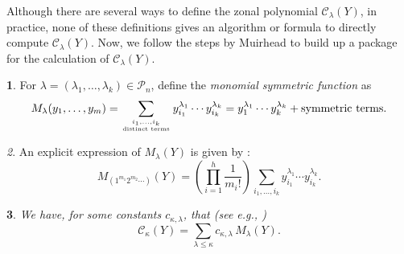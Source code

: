 \documentclass{mathincs}
\numberwithin{equation}{section}
\numberwithin{figure}{section}
\theoremstyle{plain}
\newtheorem{thm}{\protect\theoremname}[section]
\theoremstyle{definition}
\newtheorem{defn}[thm]{\protect\definitionname}
\theoremstyle{remark}
\newtheorem{rem}[thm]{\protect\remarkname}
\theoremstyle{plain}
\theoremstyle{definition}
\newtheorem{example}[thm]{\protect\examplename}
\theoremstyle{plain}
\theoremstyle{plain}
\newcommand{\SPD}{\operatorname{SPD}}
\providecommand{\definitionname}{Definition}
\providecommand{\examplename}{Example}
\providecommand{\remarkname}{Remark}
\providecommand{\theoremname}{Theorem}
\begin{document}
Although there are several ways to define the zonal polynomial $\mathcal{C}_{\lambda}(Y)$,
in practice, none of these definitions gives an algorithm or formula
to directly compute $\mathcal{C}_{\lambda}(Y)$. Now, we
follow the steps by Muirhead \cite{Muirhead} to build up a package for the
calculation of $\mathcal{C}_{\lambda}(Y)$.
\begin{defn}
For $\lambda=\left(\lambda_1,\ldots,\lambda_k\right)\in\mathcal{P}_{n}$,
define the \emph{monomial symmetric function} as 
\begin{equation}
  M_{\lambda}(y_{1},\ldots,y_{m}) =
  \sum_{\genfrac{}{}{0pt}{}{i_{1},\ldots,i_{k}}{\text{distinct terms}}}y_{i_{1}}^{\lambda_{1}}\cdots y_{i_{k}}^{\lambda_{k}}=y_{1}^{\lambda_{1}}\cdots y_{k}^{\lambda_{k}}+\text{symmetric terms}.\label{eq:MZonal}
\end{equation}
\end{defn}
\begin{rem}
An explicit expression of $M_{\lambda}(Y)$ is given by
\cite[eq.~6, p.~11]{Takemura}:
\begin{equation}\label{eq:MZonalComputation}
  M_{\left(1^{m_{1}}2^{m_{2}}\cdots\right)}\left(Y\right)=\left(\prod_{i=1}^{h}\frac{1}{m_{i}!}\right)
  \sum_{i_{1},\ldots,i_{k}}y_{i_{1}}^{\lambda_{1}}\cdots y_{i_{k}}^{\lambda_{k}}.
\end{equation}
\end{rem}
\begin{thm}
We have,  for some constants $c_{\kappa,\lambda}$, that (see e.g., \cite[eq.~13, p.~234]{Muirhead})
\begin{equation}\label{eq:CInTermsOfM}
  \mathcal{C}_{\kappa}(Y)=\sum_{\lambda\leq\kappa}c_{\kappa,\lambda}\,M_{\lambda}(Y).
\end{equation}
\end{thm}
\end{document}
